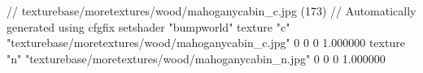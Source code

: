 // texturebase/moretextures/wood/mahoganycabin_c.jpg (173)
// Automatically generated using cfgfix
setshader "bumpworld"
texture "c" "texturebase/moretextures/wood/mahoganycabin_c.jpg" 0 0 0 1.000000
texture "n" "texturebase/moretextures/wood/mahoganycabin_n.jpg" 0 0 0 1.000000
